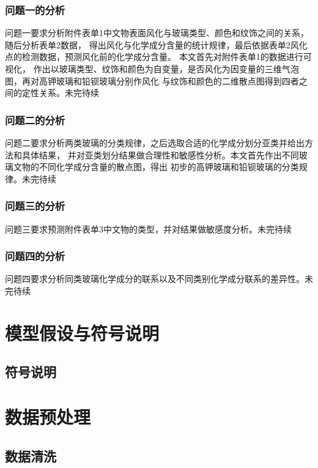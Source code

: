 \documentclass[withoutpreface,bwprint]{cumcmthesis} %
\begin{document}
\subsubsection{问题一的分析}

问题一要求分析附件表单1中文物表面风化与玻璃类型、颜色和纹饰之间的关系，随后分析表单2数据， 得出风化与化学成分含量的统计规律，最后依据表单2风化点的检测数据，预测风化前的化学成分含量。 本文首先对附件表单1的数据进行可视化， 作出以玻璃类型、纹饰和颜色为自变量，是否风化为因变量的三维气泡图，再对高钾玻璃和铅钡玻璃分别作风化 与纹饰和颜色的二维散点图得到四者之间的定性关系。未完待续

\subsubsection{问题二的分析}

问题二要求分析两类玻璃的分类规律，之后选取合适的化学成分划分亚类并给出方法和具体结果， 并对亚类划分结果做合理性和敏感性分析。本文首先作出不同玻璃文物的不同化学成分含量的散点图，得出 初步的高钾玻璃和铅钡玻璃的分类规律。未完待续

\subsubsection{问题三的分析}

问题三要求预测附件表单3中文物的类型，并对结果做敏感度分析。未完待续

\subsubsection{问题四的分析}

问题四要求分析同类玻璃化学成分的联系以及不同类别化学成分联系的差异性。未完待续

 
\section{模型假设与符号说明}
\subsection{符号说明}


\section{数据预处理}
\subsection{数据清洗}
\end{document}
